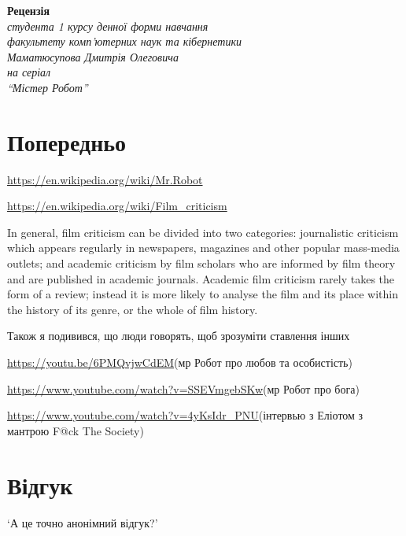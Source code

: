 \documentclass[a4paper,12pt]{article}
\begin{document}

    \begin{center}
        \textbf{Рецензія \\}
        \textit{
            студента 1 курсу денної форми навчання \\
            факультету комп'ютерних наук та кібернетики \\
            Маматюсупова Дмитрія Олеговича \\
            на серіал \\
            ``Містер Робот''}

    \end{center}

    \section{Попередньо}
    \url{https://en.wikipedia.org/wiki/Mr.Robot}


    \url{https://en.wikipedia.org/wiki/Film_criticism}

    In general, film criticism can be divided into two categories: journalistic criticism which appears regularly in newspapers,
    magazines and other popular mass-media outlets; and academic criticism by film scholars who are informed by film
    theory and are published in academic journals. Academic film criticism rarely takes the form of a review;
    instead it is more likely to analyse the film and its place within the history of its genre, or the whole of film history.

    Також я подивився, що люди говорять, щоб зрозуміти ставлення інших

    \url{https://youtu.be/6PMQvjwCdEM}(мр Робот про любов та особистість)

    \url{https://www.youtube.com/watch?v=SSEVmgebSKw}(мр Робот про бога)

    \url{https://www.youtube.com/watch?v=4yKsIdr_PNU}(інтервью з Еліотом з мантрою F@ck The Society)


    \section{Відгук}
    `А це точно анонімний відгук?'
\end{document}
